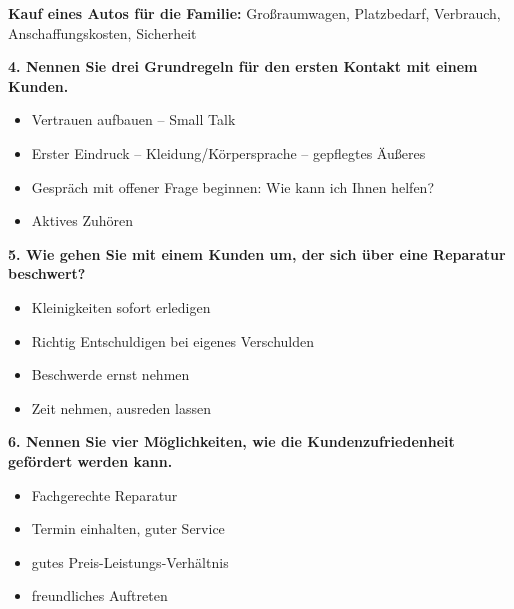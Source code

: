 \textbf{Kauf eines Autos für die Familie:} Großraumwagen, Platzbedarf,
Verbrauch, Anschaffungskosten, Sicherheit

\textbf{4. Nennen Sie drei Grundregeln für den ersten Kontakt mit einem
Kunden.}

\begin{itemize}
\item
  Vertrauen aufbauen -- Small Talk
\item
  Erster Eindruck -- Kleidung/Körpersprache -- gepflegtes Äußeres
\item
  Gespräch mit offener Frage beginnen: Wie kann ich Ihnen helfen?
\item
  Aktives Zuhören
\end{itemize}

\textbf{5. Wie gehen Sie mit einem Kunden um, der sich über eine
Reparatur beschwert?}

\begin{itemize}
\item
  Kleinigkeiten sofort erledigen
\item
  Richtig Entschuldigen bei eigenes Verschulden
\item
  Beschwerde ernst nehmen
\item
  Zeit nehmen, ausreden lassen
\end{itemize}

\textbf{6. Nennen Sie vier Möglichkeiten, wie die Kundenzufriedenheit
gefördert werden kann.}

\begin{itemize}
\item
  Fachgerechte Reparatur
\item
  Termin einhalten, guter Service
\item
  gutes Preis-Leistungs-Verhältnis
\item
  freundliches Auftreten
\end{itemize}
